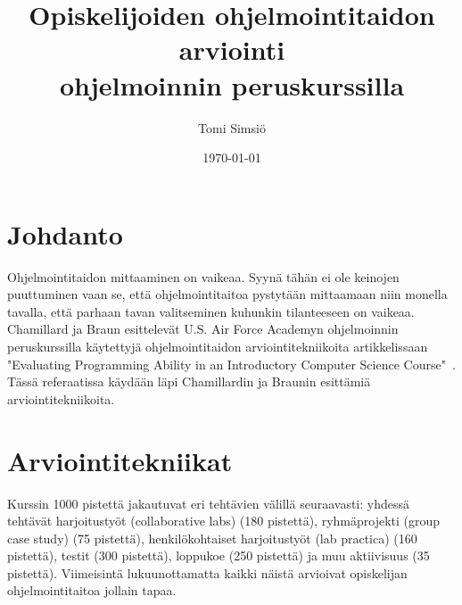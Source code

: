 \documentclass[finnish]{../tktltiki2}
\title{Opiskelijoiden ohjelmointitaidon arviointi\\ohjelmoinnin peruskurssilla}
\author{Tomi Simsiö}
\date{\today}
\theoremstyle{definition}
\theoremstyle{remark}
\begin{document}

\maketitle
\tableofcontents
\newpage



\section{Johdanto}

Ohjelmointitaidon mittaaminen on vaikeaa. Syynä tähän ei ole keinojen puuttuminen vaan se, että ohjelmointitaitoa pystytään mittaamaan niin monella tavalla, että parhaan tavan valitseminen kuhunkin tilanteeseen on vaikeaa. Chamillard ja Braun esittelevät U.S. Air Force Academyn ohjelmoinnin peruskurssilla käytettyjä ohjelmointitaidon arviointitekniikoita artikkelissaan "Evaluating Programming Ability in an Introductory Computer Science Course"~\cite{CB00}. Tässä referaatissa käydään läpi Chamillardin ja Braunin esittämiä arviointitekniikoita.

\section{Arviointitekniikat}

Kurssin 1000 pistettä jakautuvat eri tehtävien välillä seuraavasti: yhdessä tehtävät harjoitustyöt (collaborative labs) (180 pistettä), ryhmäprojekti (group case study) (75 pistettä), henkilökohtaiset harjoitustyöt (lab practica) (160 pistettä), testit (300 pistettä), loppukoe (250 pistettä) ja muu aktiivisuus (35 pistettä). Viimeisintä lukuunottamatta kaikki näistä arvioivat opiskelijan ohjelmointitaitoa jollain tapaa.
\end{document}
